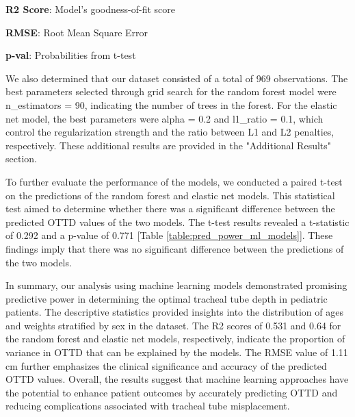 \documentclass[11pt]{article}
\begin{document}
\begin{table}[h]
\caption{Predictive Power of Machine Learning Models}
\label{table:pred_power_ml_models}
\begin{threeparttable}
\renewcommand{\TPTminimum}{\linewidth}
\begin{tablenotes}
\footnotesize
\item \textbf{R2 Score}: Model's goodness-of-fit score
\item \textbf{RMSE}: Root Mean Square Error
\item \textbf{p-val}: Probabilities from t-test
\end{tablenotes}
\end{threeparttable}
\end{table}


We also determined that our dataset consisted of a total of 969 observations. The best parameters selected through grid search for the random forest model were n\_estimators = 90, indicating the number of trees in the forest. For the elastic net model, the best parameters were alpha = 0.2 and l1\_ratio = 0.1, which control the regularization strength and the ratio between L1 and L2 penalties, respectively. These additional results are provided in the "Additional Results" section.

To further evaluate the performance of the models, we conducted a paired t-test on the predictions of the random forest and elastic net models. This statistical test aimed to determine whether there was a significant difference between the predicted OTTD values of the two models. The t-test results revealed a t-statistic of 0.292 and a p-value of 0.771 [Table {}\ref{table:pred_power_ml_models}]. These findings imply that there was no significant difference between the predictions of the two models.

In summary, our analysis using machine learning models demonstrated promising predictive power in determining the optimal tracheal tube depth in pediatric patients. The descriptive statistics provided insights into the distribution of ages and weights stratified by sex in the dataset. The R2 scores of 0.531 and 0.64 for the random forest and elastic net models, respectively, indicate the proportion of variance in OTTD that can be explained by the models. The RMSE value of 1.11 cm further emphasizes the clinical significance and accuracy of the predicted OTTD values. Overall, the results suggest that machine learning approaches have the potential to enhance patient outcomes by accurately predicting OTTD and reducing complications associated with tracheal tube misplacement.
\end{document}
